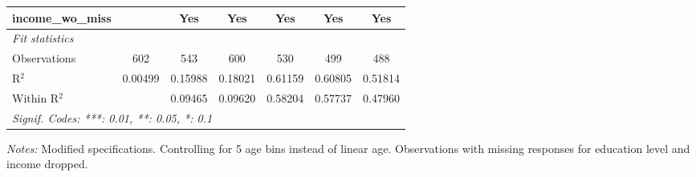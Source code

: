 \begin{tabular}{lcccccc}
   income\_wo\_miss                          &          & Yes           & Yes      & Yes          & Yes          & Yes\\  
   \midrule
   \emph{Fit statistics}\\
   Observations                              & 602      & 543           & 600      & 530          & 499          & 488\\  
   R$^2$                                     & 0.00499  & 0.15988       & 0.18021  & 0.61159      & 0.60805      & 0.51814\\  
   Within R$^2$                              &          & 0.09465       & 0.09620  & 0.58204      & 0.57737      & 0.47960\\  
   \midrule \midrule
   \multicolumn{7}{l}{\emph{Signif. Codes: ***: 0.01, **: 0.05, *: 0.1}}\\
\end{tabular}
 
\par \raggedright 
\textit{Notes:} Modified specifications. Controlling for 5 age bins instead of linear age. Observations with missing responses for education level and income dropped.
\par\endgroup



